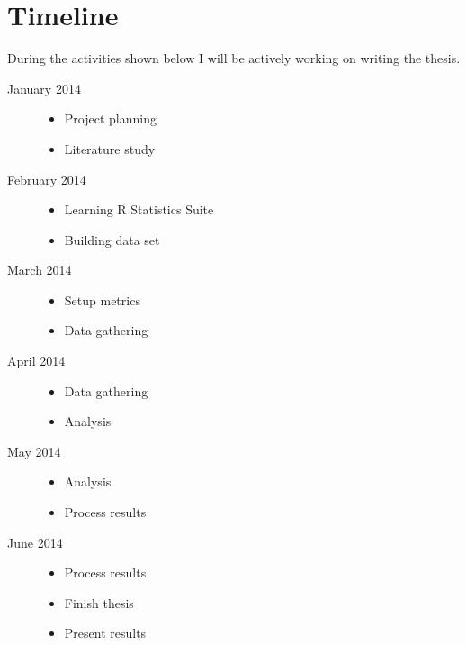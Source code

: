 \section{Timeline}
During the activities shown below I will be actively working on writing the
thesis.
\begin{description}
	\item[January 2014] \hfill
		\begin{itemize}
			\item Project planning
			\item Literature study
		\end{itemize}
	\item[February 2014] \hfill
		\begin{itemize}
			\item Learning R Statistics Suite
			\item Building data set
		\end{itemize}
	\item[March 2014] \hfill
		\begin{itemize}
			\item Setup metrics
			\item Data gathering
		\end{itemize}
	\item[April 2014] \hfill
		\begin{itemize}
			\item Data gathering
			\item Analysis
		\end{itemize}
	\item[May 2014] \hfill
		\begin{itemize}
			\item Analysis
			\item Process results
		\end{itemize}
	\item[June 2014] \hfill
		\begin{itemize}
			\item Process results
			\item Finish thesis
			\item Present results
		\end{itemize}
\end{description}

